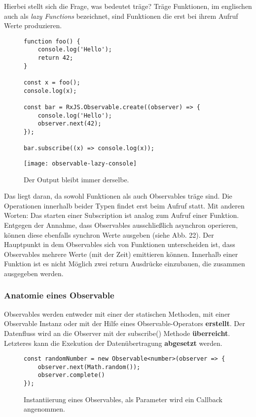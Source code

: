 \noindent
Hierbei stellt sich die Frage, was bedeutet träge? Träge Funktionen, im englischen auch als \textit{lazy Functions} bezeichnet, sind Funktionen die erst bei ihrem Aufruf Werte produzieren.\cite{lazy-functions}

\begin{figure}[H]
\begin{lstlisting}[basicstyle=\small]
function foo() {
    console.log('Hello');
    return 42;
}

const x = foo();
console.log(x);

const bar = RxJS.Observable.create((observer) => {
    console.log('Hello');
    observer.next(42);
});

bar.subscribe((x) => console.log(x));
\end{lstlisting}
\end{figure}

\begin{figure}[H]
\begin{center}
\texttt{[image: observable-lazy-console]}
\end{center}
\caption{Der Output bleibt immer derselbe.}
\end{figure}

\noindent
Das liegt daran, da sowohl Funktionen als auch Observables träge sind. Die Operationen innerhalb beider Typen findet erst beim Aufruf statt. Mit anderen Worten: Das starten einer Subscription ist analog zum Aufruf einer Funktion. Entgegen der Annahme, dass Observables ausschließlich asynchron operieren, können diese ebenfalls synchron Werte ausgeben (siehe Abb. 22). Der Hauptpunkt in dem Observables sich von Funktionen unterscheiden ist, dass Observables mehrere Werte (mit der Zeit) emittieren können. Innerhalb einer Funktion ist es nicht Möglich zwei return Ausdrücke einzubauen, die zusammen ausgegeben werden.

\subsubsection{Anatomie eines Observable}
Observables werden entweder mit einer der statischen Methoden, mit einer Observable Instanz oder mit der Hilfe eines Observable-Operators \textbf{erstellt}. Der Datenfluss wird an die Observer mit der subscribe() Methode \textbf{überreicht}. Letzteres kann die Exekution der Datenübertragung \textbf{abgesetzt} werden.

\begin{figure}[H]
\begin{lstlisting}[basicstyle=\small]
const randomNumber = new Observable<number>(observer => {
    observer.next(Math.random());
    observer.complete()
});
\end{lstlisting}
\caption{Instantiierung eines Observables, als Parameter wird ein Callback angenommen.}
\end{figure}

